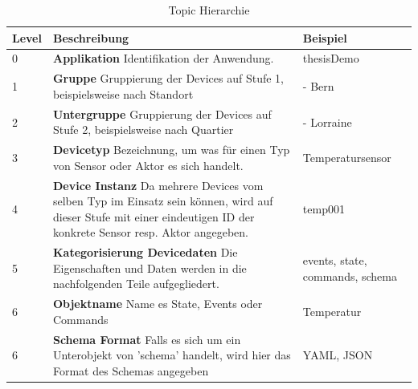 \begin{table}[H]
\begin{tabularx}{\textwidth}{|l|X|l|}

 \hline
 {\bf Level } & {\bf Beschreibung } & {\bf Beispiel } \\ 
 \hline
 0  &   \textbf{Applikation} \newline Identifikation der Anwendung.  &    
  thesisDemo   \\ \hline
 
 1  &   \textbf{Gruppe}  \newline Gruppierung der Devices auf Stufe 1, beispielsweise nach Standort  &     - Bern  \\ \hline

 2  &   \textbf{Untergruppe} \newline Gruppierung der Devices auf Stufe 2, beispielsweise nach Quartier   &   - Lorraine  \\ \hline

 3  &   \textbf{Devicetyp} \newline Bezeichnung, um was für einen Typ von Sensor oder Aktor es sich handelt.  &   Temperatursensor   \\ \hline

 4  &   \textbf{Device Instanz} \newline Da mehrere Devices vom selben Typ im Einsatz sein können, wird auf dieser Stufe mit einer eindeutigen ID der konkrete Sensor resp. Aktor angegeben.   &    temp001   \\ \hline
 
 5  &   \textbf{Kategorisierung Devicedaten} \newline  Die Eigenschaften und Daten werden in die nachfolgenden Teile aufgegliedert.  &     events, state, commands, schema   \\ \hline
 
 6  &   \textbf{Objektname} \newline Name es State, Events oder Commands \newline     &     Temperatur   \\ \hline

 6  &   \textbf{Schema Format} \newline Falls es sich um ein Unterobjekt von 'schema' handelt, wird hier das Format des Schemas angegeben   &     YAML, JSON   \\ \hline
 

\end{tabularx}
\caption{Topic Hierarchie}
\end{table}


